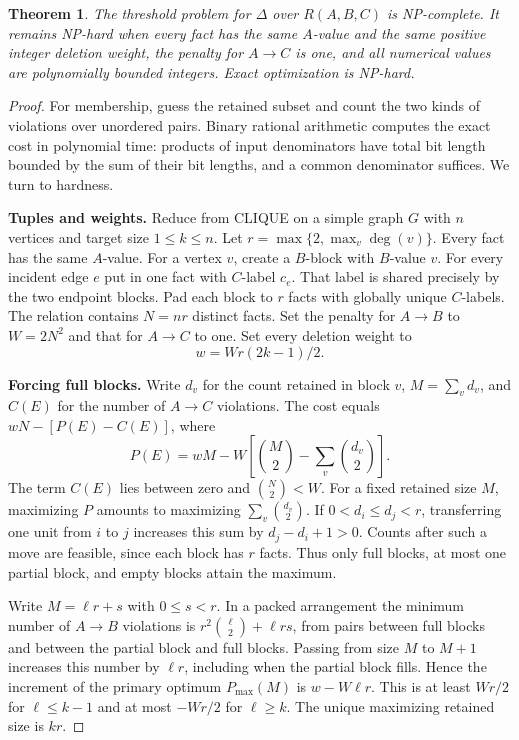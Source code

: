 \documentclass[11pt,a4paper]{amsart}
\newtheorem{theorem}{Theorem}
\begin{document}
\begin{theorem}
The threshold problem for $\Delta$ over $R(A,B,C)$ is NP-complete. It remains NP-hard when every fact has the same $A$-value and the same positive integer deletion weight, the penalty for $A\to C$ is one, and all numerical values are polynomially bounded integers. Exact optimization is NP-hard.
\end{theorem}
\begin{proof}
For membership, guess the retained subset and count the two kinds of violations over unordered pairs. Binary rational arithmetic computes the exact cost in polynomial time: products of input denominators have total bit length bounded by the sum of their bit lengths, and a common denominator suffices. We turn to hardness.

\medskip
\noindent\textbf{Tuples and weights.}
Reduce from CLIQUE \cite{karp} on a simple graph $G$ with $n$ vertices and target size $1\le k\le n$. Let $r=\max\{2,\max_v\deg(v)\}$. Every fact has the same $A$-value. For a vertex $v$, create a $B$-block with $B$-value $v$. For every incident edge $e$ put in one fact with $C$-label $c_e$. That label is shared precisely by the two endpoint blocks. Pad each block to $r$ facts with globally unique $C$-labels. The relation contains $N=nr$ distinct facts. Set the penalty for $A\to B$ to $W=2N^2$ and that for $A\to C$ to one. Set every deletion weight to
\[
             w=Wr(2k-1)/2 .
\]

\medskip
\noindent\textbf{Forcing full blocks.}
Write $d_v$ for the count retained in block $v$, $M=\sum_v d_v$, and $C(E)$ for the number of $A\to C$ violations. The cost equals $wN-[P(E)-C(E)]$, where
\[
 P(E)=wM-W\left[\binom M2-\sum_v\binom{d_v}{2}\right].
\]
The term $C(E)$ lies between zero and $\binom N2<W$. For a fixed retained size $M$, maximizing $P$ amounts to maximizing $\sum_v\binom{d_v}{2}$. If $0<d_i\le d_j<r$, transferring one unit from $i$ to $j$ increases this sum by $d_j-d_i+1>0$. Counts after such a move are feasible, since each block has $r$ facts. Thus only full blocks, at most one partial block, and empty blocks attain the maximum.

Write $M=\ell r+s$ with $0\le s<r$. In a packed arrangement the minimum number of $A\to B$ violations is $r^2\binom{\ell}{2}+\ell r s$, from pairs between full blocks and between the partial block and full blocks. Passing from size $M$ to $M+1$ increases this number by $\ell r$, including when the partial block fills. Hence the increment of the primary optimum $P_{\max}(M)$ is $w-W\ell r$. This is at least $Wr/2$ for $\ell\le k-1$ and at most $-Wr/2$ for $\ell\ge k$. The unique maximizing retained size is $kr$.


\end{proof}
\end{document}
